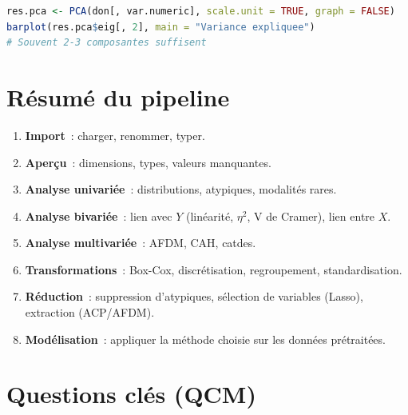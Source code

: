 \documentclass[a4paper,11pt]{article}
\theoremstyle{definition}
\theoremstyle{remark}
\begin{document}
\begin{lstlisting}[language=R]
res.pca <- PCA(don[, var.numeric], scale.unit = TRUE, graph = FALSE)
barplot(res.pca$eig[, 2], main = "Variance expliquee")
# Souvent 2-3 composantes suffisent
\end{lstlisting}

\section{Résumé du pipeline}

\begin{enumerate}
  \item \textbf{Import}~: charger, renommer, typer.
  \item \textbf{Aperçu}~: dimensions, types, valeurs manquantes.
  \item \textbf{Analyse univariée}~: distributions, atypiques,
    modalités rares.
  \item \textbf{Analyse bivariée}~: lien avec $Y$ (linéarité,
    $\eta^2$, V de Cramer), lien entre $X$.
  \item \textbf{Analyse multivariée}~: AFDM, CAH, catdes.
  \item \textbf{Transformations}~: Box-Cox, discrétisation,
    regroupement, standardisation.
  \item \textbf{Réduction}~: suppression d'atypiques, sélection de
    variables (Lasso), extraction (ACP/AFDM).
  \item \textbf{Modélisation}~: appliquer la méthode choisie sur
    les données prétraitées.
\end{enumerate}

\section*{Questions clés (QCM)}

\end{document}
